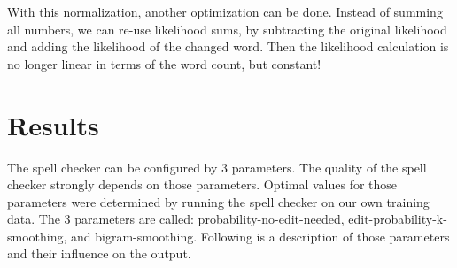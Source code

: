 \documentclass[11pt,a4paper]{article}
\begin{document}
With this normalization, another optimization can be done. Instead of summing all numbers, we can re-use likelihood sums, by subtracting the original likelihood and adding the likelihood of the changed word. Then the likelihood calculation is no longer linear in terms of the word count, but constant!

\section{Results}
The spell checker can be configured by 3 parameters. The quality of the spell checker strongly depends on those parameters. Optimal values for those parameters were determined by running the spell checker on our own training data. The 3 parameters are called: probability-no-edit-needed, edit-probability-k-smoothing, and bigram-smoothing. Following is a description of those parameters and their influence on the output.
\end{document}
